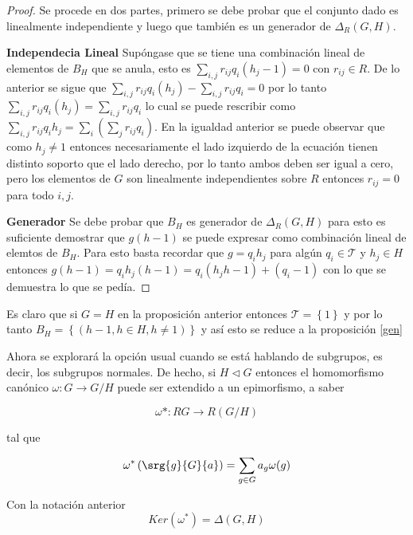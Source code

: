 \begin{proof}
Se procede en dos partes, primero se debe probar que el conjunto dado es linealmente independiente y luego que también es un generador de $\Delta_R(G,H)$. 

\textbf{Independecia Lineal} Supóngase que se tiene una combinación lineal de elementos de $B_H$ que se anula, esto es $\sum_{i,j}r_{ij}q_i(h_j-1) =0 $ con $r_{ij} \in R$. De lo anterior se sigue que $\sum_{i,j}r_{ij}q_i(h_j)-\sum_{i,j}r_{ij}q_i = 0$ por lo tanto $ \sum_{i,j}r_{ij}q_i(h_j) = \sum_{i,j}r_{ij}q_i $ lo cual se puede rescribir como $\sum_{i,j}r_{ij}q_ih_j =  \sum_i\left( \sum_jr_{ij}q_i \right)$. En la igualdad anterior se puede observar que como $h_j \neq 1$ entonces necesariamente el lado izquierdo de la ecuación tienen distinto soporto que el lado derecho, por lo tanto ambos deben ser igual a cero, pero los elementos de $G$ son linealmente independientes sobre $R$ entonces $r_{ij} = 0$  para todo $i,j$.

\textbf{Generador}
Se debe probar que $B_H$ es generador de $\Delta_R(G,H)$ para esto es suficiente demostrar que $g(h-1)$  se puede expresar  como combinación lineal de elemtos de $B_H$. Para esto basta recordar que $g = q_ih_j$ para algún $q_i \in \mathcal{T}$ y $h_j \in H$ entonces $g(h-1) = q_ih_j(h-1) = q_i(h_jh-1)+ (q_i-1) $ con lo que se demuestra lo que se pedía. \qedhere
\end{proof}


\begin{nota}
Es claro que si $G=H$ en la proposición anterior entonces $\mathcal{T} = \left\{ 1 \right\}$ y por lo tanto $B_H = \left\{ (h-1 , h \in H, h \neq 1) \right\}$ y así esto se reduce a la proposición \ref{gen} 

\end{nota}

Ahora se explorará la opción usual cuando se está hablando de subgrupos, es decir, los subgrupos normales. De hecho, si $H \lhd G$ entonces el homomorfismo canónico $\omega : G \to G/H$ puede ser extendido a un epimorfismo, a saber 

\[\omega* : RG \to R(G/H)\]

tal que 

\[\omega^*\left(\srg{g}{G}{a} \right) = \sum_{g \in G} a_g\omega(g)\]

\begin{proposicion}
Con la notación anterior
$$Ker(\omega^*) =\Delta(G,H)$$
\end{proposicion}

